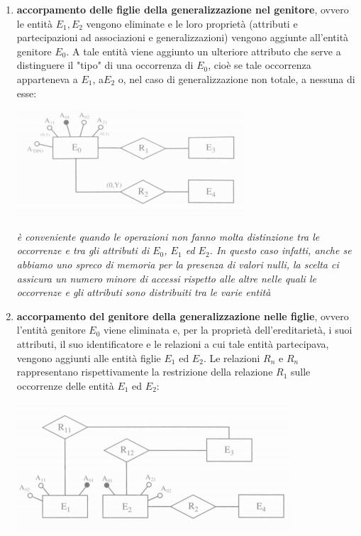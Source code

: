 \documentclass[a4paper,12pt, oneside]{book}
\begin{document}
\begin{enumerate}
\item \textbf{accorpamento delle figlie della generalizzazione nel genitore}, ovvero le entità $E_1,E_2$ vengono eliminate e le loro proprietà (attributi e partecipazioni ad
  associazioni e generalizzazioni) vengono aggiunte all'entità genitore $E_0$.
  A tale entità viene aggiunto un ulteriore attributo che serve a distinguere
  il "tipo" di una occorrenza di $E_0$, cioè se tale occorrenza apparteneva a $E_1$,
  a$E_2$  o, nel caso di generalizzazione non totale, a nessuna di esse:
  \begin{center}
  \includegraphics[scale=1]{img/genr2.png}
  \end{center}
  \textit{è conveniente quando le operazioni non fanno molta distinzione
    tra le occorrenze e tra gli attributi di $E_0$, $E_1$ ed $E_2$. In questo caso infatti,
    anche se abbiamo uno spreco di memoria per la presenza di valori nulli, la
    scelta ci assicura un numero minore di accessi rispetto alle altre nelle quali le
    occorrenze e gli attributi sono distribuiti tra le varie entità}
\item \textbf{accorpamento del genitore della generalizzazione nelle figlie},
  ovvero l'entità genitore $E_0$ viene eliminata e, per la proprietà dell'ereditarietà, i suoi attributi, il
suo identificatore e le relazioni a cui tale entità partecipava, vengono aggiunti
alle entità figlie $E_1$ ed $E_2$. Le relazioni $R_n$ e $R_n$ rappresentano rispettivamente
la restrizione della relazione $R_1$ sulle occorrenze delle entità $E_1$ ed $E_2$:
  \begin{center}
  \includegraphics[scale=1]{img/genr3.png}

\end{center}
\end{enumerate}
\end{document}
